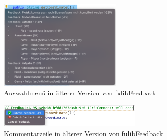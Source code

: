 \begin{figure}
    \centering
    \includegraphics[width=0.54\textwidth]{images/fulibFeedback-old-menu}
    \caption{Auswahlmenü in älterer Version von fulibFeedback}
    \label{fig:fulibFeedback-old-menu}
\end{figure}

\begin{figure}
    \centering
    \includegraphics[width=0.63\textwidth]{images/fulibFeedback-old-comment}
    \caption{Kommentarzeile in älterer Version von fulibFeedback}
    \label{fig:fulibFeedback-old-comment}
\end{figure}

